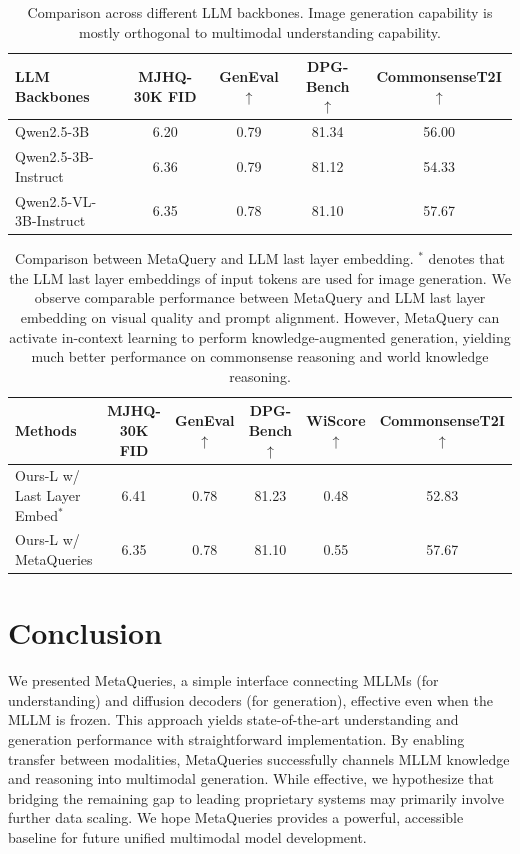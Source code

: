 \documentclass[]{fairmeta}
\newcommand\our{{\fontfamily{lmtt}\selectfont MetaQuery}\xspace}
\newcommand\ours{{\fontfamily{lmtt}\selectfont MetaQueries}\xspace}
\begin{document}
\begin{table}[!t]
    \small
    \centering
    \begin{tabular}{lcccc}
        \textbf{LLM Backbones} & \textbf{MJHQ-30K FID } & \textbf{GenEval $\uparrow$} & \textbf{DPG-Bench $\uparrow$} & \textbf{CommonsenseT2I $\uparrow$} \\
        \midrule
 Qwen2.5-3B & 6.20 & 0.79 & 81.34 & 56.00 \\
 Qwen2.5-3B-Instruct & 6.36 & 0.79 & 81.12 & 54.33 \\
 Qwen2.5-VL-3B-Instruct & 6.35 & 0.78 & 81.10 & 57.67 \\
        
    \end{tabular}
    \caption{Comparison across different LLM backbones. Image generation capability is mostly orthogonal to multimodal understanding capability.}
    \label{tab:llm_comparsion}
\end{table}

\begin{table}[!t]
    \small
    \centering
    \begin{tabular}{lccccc}
        \textbf{Methods} & \textbf{MJHQ-30K FID } & \textbf{GenEval $\uparrow$} & \textbf{DPG-Bench $\uparrow$} & \textbf{WiScore $\uparrow$} & \textbf{CommonsenseT2I $\uparrow$} \\
        \midrule
 Ours-L w/ Last Layer Embed$^*$ & 6.41 & \cellcolor{green!10}0.78 & \cellcolor{green!10}81.23 & 0.48 & 52.83 \\
 Ours-L w/ \ours & \cellcolor{green!10}6.35 & \cellcolor{green!10}0.78 & 81.10 & \cellcolor{green!10}0.55 & \cellcolor{green!10}57.67 \\
    \end{tabular}
    \caption{Comparison between \our and LLM last layer embedding. $^*$ denotes that the LLM last layer embeddings of input tokens are used for image generation. We observe comparable performance between \our and LLM last layer embedding on visual quality and prompt alignment. However, \our can activate in-context learning to perform knowledge-augmented generation, yielding much better performance on commonsense reasoning and world knowledge reasoning.}
    \label{tab:encoder_style_comparsion}
\end{table}


\section{Conclusion}
We presented \ours, a simple interface connecting MLLMs (for understanding) and diffusion decoders (for generation), effective even when the MLLM is frozen. This approach yields state-of-the-art understanding and generation performance with straightforward implementation. By enabling transfer between modalities, \ours successfully channels MLLM knowledge and reasoning into multimodal generation. While effective, we hypothesize that bridging the remaining gap to leading proprietary systems may primarily involve further data scaling. We hope \ours provides a powerful, accessible baseline for future unified multimodal model development.
\end{document}
